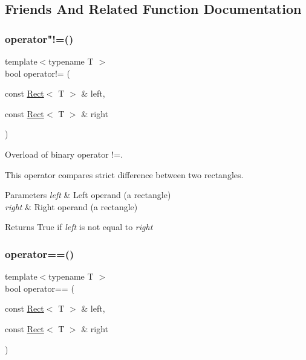 \subsection{Friends And Related Function Documentation}
\mbox{\label{classsf_1_1_rect_a03fc4c105687b7d0f07b6b4ed4b45581}} 
\subsubsection{\texorpdfstring{operator"!=()}{operator!=()}}
{\footnotesize\ttfamily template$<$typename T $>$ \\
bool operator!= (\begin{DoxyParamCaption}\item[{const \hyperlink{classsf_1_1_rect}{Rect}$<$ T $>$ \&}]{left,  }\item[{const \hyperlink{classsf_1_1_rect}{Rect}$<$ T $>$ \&}]{right }\end{DoxyParamCaption})\hspace{0.3cm}{\ttfamily [related]}}



Overload of binary operator !=. 

This operator compares strict difference between two rectangles.


\begin{DoxyParams}{Parameters}
{\em left} & Left operand (a rectangle) \\
\hline
{\em right} & Right operand (a rectangle)\\
\hline
\end{DoxyParams}
\begin{DoxyReturn}{Returns}
True if {\itshape left} is not equal to {\itshape right} 
\end{DoxyReturn}
\mbox{\label{classsf_1_1_rect_ab3488b5dbd0e587c4d7cb80605affc46}} 
\subsubsection{\texorpdfstring{operator==()}{operator==()}}
{\footnotesize\ttfamily template$<$typename T $>$ \\
bool operator== (\begin{DoxyParamCaption}\item[{const \hyperlink{classsf_1_1_rect}{Rect}$<$ T $>$ \&}]{left,  }\item[{const \hyperlink{classsf_1_1_rect}{Rect}$<$ T $>$ \&}]{right }\end{DoxyParamCaption})\hspace{0.3cm}{\ttfamily [related]}}



